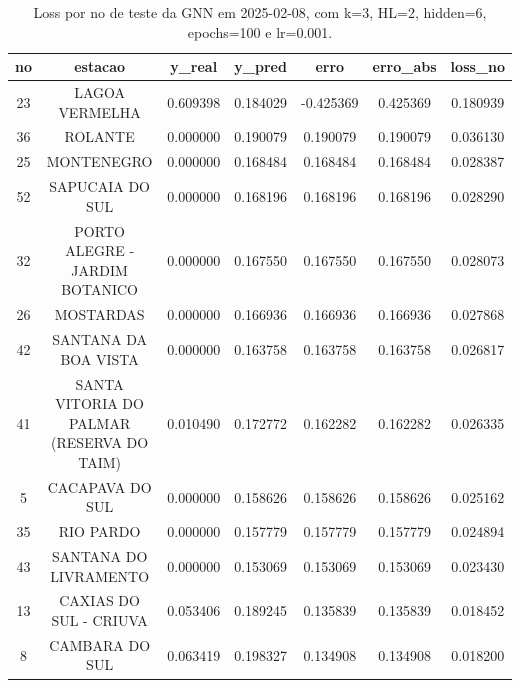 \begin{table}[h]
\centering
\caption{Loss por no de teste da GNN em 2025-02-08, com k=3, HL=2, hidden=6, epochs=100 e lr=0.001.}
\label{tab:gnn_loss_k3_hl2_h6_e100_d20250208}
\begin{tabular}{ccccccc}
\toprule
no & estacao & y\_real & y\_pred & erro & erro\_abs & loss\_no \\
\midrule
23 & LAGOA VERMELHA & 0.609398 & 0.184029 & -0.425369 & 0.425369 & 0.180939 \\
36 & ROLANTE & 0.000000 & 0.190079 & 0.190079 & 0.190079 & 0.036130 \\
25 & MONTENEGRO & 0.000000 & 0.168484 & 0.168484 & 0.168484 & 0.028387 \\
52 & SAPUCAIA DO SUL & 0.000000 & 0.168196 & 0.168196 & 0.168196 & 0.028290 \\
32 & PORTO ALEGRE - JARDIM BOTANICO & 0.000000 & 0.167550 & 0.167550 & 0.167550 & 0.028073 \\
26 & MOSTARDAS & 0.000000 & 0.166936 & 0.166936 & 0.166936 & 0.027868 \\
42 & SANTANA DA BOA VISTA & 0.000000 & 0.163758 & 0.163758 & 0.163758 & 0.026817 \\
41 & SANTA VITORIA DO PALMAR (RESERVA DO TAIM) & 0.010490 & 0.172772 & 0.162282 & 0.162282 & 0.026335 \\
5 & CACAPAVA DO SUL & 0.000000 & 0.158626 & 0.158626 & 0.158626 & 0.025162 \\
35 & RIO PARDO & 0.000000 & 0.157779 & 0.157779 & 0.157779 & 0.024894 \\
43 & SANTANA DO LIVRAMENTO & 0.000000 & 0.153069 & 0.153069 & 0.153069 & 0.023430 \\
13 & CAXIAS DO SUL - CRIUVA & 0.053406 & 0.189245 & 0.135839 & 0.135839 & 0.018452 \\
8 & CAMBARA DO SUL & 0.063419 & 0.198327 & 0.134908 & 0.134908 & 0.018200 \\
\bottomrule
\end{tabular}
\end{table}
